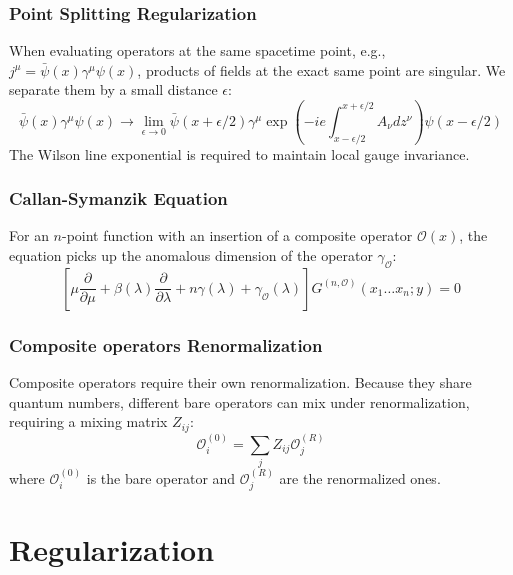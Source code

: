 \documentclass{article}
\begin{document}
\subsubsection*{Point Splitting Regularization}
When evaluating operators at the same spacetime point, e.g., $j^\mu = \bar{\psi}(x)\gamma^\mu\psi(x)$, products of fields at the exact same point are singular. We separate them by a small distance $\epsilon$:
\begin{equation}
    \bar{\psi}(x)\gamma^\mu\psi(x) \longrightarrow \lim_{\epsilon \to 0} \bar{\psi}(x+\epsilon/2) \gamma^\mu \exp\left( -ie \int_{x-\epsilon/2}^{x+\epsilon/2} A_\nu dz^\nu \right) \psi(x-\epsilon/2)
\end{equation}
The Wilson line exponential is required to maintain local gauge invariance.
\subsubsection*{Callan-Symanzik Equation}
For an $n$-point function with an insertion of a composite operator $\mathcal{O}(x)$, the equation picks up the anomalous dimension of the operator $\gamma_\mathcal{O}$:
\begin{equation}
    \left[ \mu \frac{\partial}{\partial \mu} + \beta(\lambda) \frac{\partial}{\partial \lambda} + n \gamma(\lambda) + \gamma_{\mathcal{O}}(\lambda) \right] G^{(n, \mathcal{O})}(x_1 \dots x_n; y) = 0
\end{equation}
\subsubsection*{Composite operators Renormalization}
Composite operators require their own renormalization. Because they share quantum numbers, different bare operators can mix under renormalization, requiring a mixing matrix $Z_{ij}$:
\begin{equation}
    \mathcal{O}_i^{(0)} = \sum_j Z_{ij} \mathcal{O}_j^{(R)}
\end{equation}
where $\mathcal{O}_i^{(0)}$ is the bare operator and $\mathcal{O}_j^{(R)}$ are the renormalized ones.

\newpage
\section{Regularization}
\end{document}
